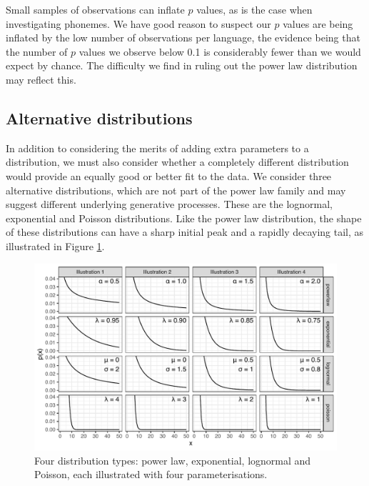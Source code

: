 Small samples of observations can inflate \(p\) values, as is the case when investigating phonemes. We have good reason to suspect our \(p\) values are being inflated by the low number of observations per language, the evidence being that the number of \(p\) values we observe below 0.1 is considerably fewer than we would expect by chance. The difficulty we find in ruling out the power law distribution may reflect this.

\hypertarget{alternative-distributions}{%
\subsection{Alternative distributions}\label{alternative-distributions}}

In addition to considering the merits of adding extra parameters to a distribution, we must also consider whether a completely different distribution would provide an equally good or better fit to the data. We consider three alternative distributions, which are not part of the power law family and may suggest different underlying generative processes. These are the lognormal, exponential and Poisson distributions. Like the power law distribution, the shape of these distributions can have a sharp initial peak and a rapidly decaying tail, as illustrated in Figure \ref{fig:Figure-3}.

\begin{figure}

{\centering \includegraphics[width=\textwidth]{03-phoneme-frequencies/fig/Fig3_distribution_illustrations} 

}

\caption[Illustrations of power law, exponential, lognormal and Poisson distributions]{Four distribution types: power law, exponential, lognormal and Poisson, each illustrated with four parameterisations.}\label{fig:Figure-3}
\end{figure}

